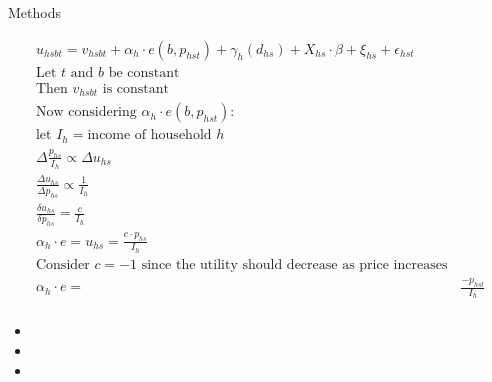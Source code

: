 \documentclass[final]{beamer}
\newlength{\onecolwid}
\newlength{\twocolwid}
\begin{document}
\begin{frame}[t]
\begin{columns}[t]
\begin{column}{\twocolwid}
\begin{columns}[t,totalwidth=\twocolwid] %

\begin{column}{\onecolwid}\vspace{-.6in} %




\end{column} %

\begin{column}{\onecolwid}\vspace{-.6in} %


\begin{block}{Methods}
{\small
\begin{eqnarray*}
&& u_{hsbt} = v_{hsbt} + \alpha_{h}\cdot e(b,p_{hst}) + \gamma_{h}(d_{hs}) + X_{hs}\cdot \beta +\xi_{hs}+\epsilon_{hst} \\
&& \mbox{Let $t$ and $b$ be constant}\\
&& \mbox{Then $v_{hsbt}$ is constant}\\
&& \mbox{Now considering $\alpha_{h}\cdot e(b,p_{hst})$:}\\
&&      \mbox{let } I_{h} = \mbox{income of household $h$}\\
&&      \Delta \frac{p_{hs}}{I_{h}} \propto \Delta u_{hs}\\
&&      \frac{\Delta u_{hs}}{\Delta p_{hs}} \propto \frac{1}{I_{h}}\\
&&      \frac{\delta u_{hs}}{\delta p_{hs}} = \frac{c}{I_{h}}\\
&&      \alpha_h \cdot e=u_{hs} = \frac{c\cdot p_{hs}}{I_{h}}\\
&&      \mbox{Consider $c=-1$ since the utility should decrease as price increases}\\
&& 	    \alpha_h \cdot e = && \frac{ -p_{hst}}{I_{h}}\\
\end{eqnarray*}
\begin{itemize}
\item 
\item
\item \end{itemize}
}
\end{block}


\end{column}
\end{columns}
\end{column}
\end{columns}
\end{frame}
\end{document}
